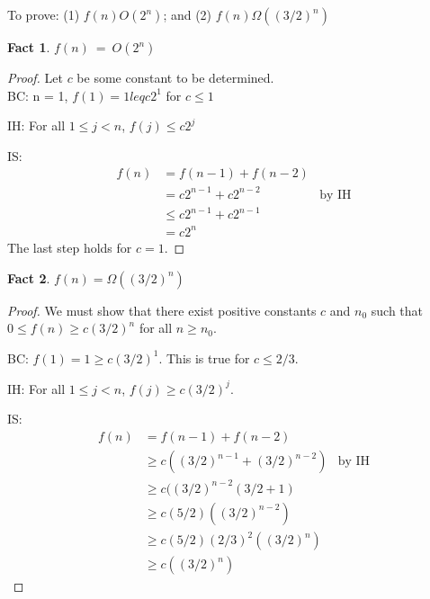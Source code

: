 \documentclass{article}
\newtheorem{fact}{Fact}
\begin{document}
\medskip

To prove: (1) $f(n) O\left( 2^{n}\right)$; and (2) $f(n) \Omega \left(( 3/2)^{n}\right)$

\medskip

\begin{fact}
    $\displaystyle f( n) \ =\ O\left( 2^{n}\right)$
\end{fact}

\begin{proof}
    Let $c$ be some constant to be determined.\\
BC: n = 1, $f(1) = 1 leq c2^1$ for $c \leq 1$

IH: For all $1 \leq j < n$, $f(j) \leq c2^{j}$ 

IS: 
\begin{align*}
    f(n) &= f(n-1) + f(n-2) \\
    & = c2^{n-1} + c2^{n-2} & \text{by IH}\\
    & \leq c2^{n-1} + c2^{n-1} \\
    & = c2^n
\end{align*}
The last step holds for $c = 1$.
\end{proof}

\newpage

\begin{fact}
    $f(n) = \Omega((3/2)^n)$
\end{fact}

\begin{proof}
    We must show that there exist positive constants $c$ and $n_0$ such that $0 \leq f(n) \geq c (3/2)^n$ for all $n \geq n_0$.

BC: $f(1) = 1 \geq c (3/2)^1$.  This is true for $c \leq 2/3$.

IH: For all $1 \leq j < n$, $f(j) \geq c (3/2)^j$.

IS: 
   \begin{align*}
    f(n) &= f(n-1) + f(n-2)\\
         &\geq c ((3/2)^{n-1} + (3/2)^{n-2}) & \text{by IH}\\
         & \geq c ((3/2)^{n-2}(3/2 + 1)\\
        & \geq c (5/2) ((3/2)^{n-2})\\
        & \geq c (5/2)(2/3)^2 ((3/2)^n)\\
        & \geq c ((3/2)^n)
\end{align*}
\end{proof}
\end{document}
